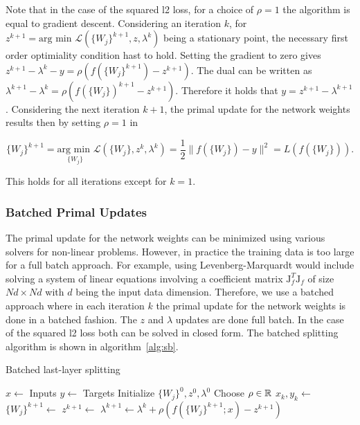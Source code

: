 \documentclass[english,11pt,a4paper]{article}
\begin{document}
Note that in the case of the squared l2 loss, for a choice of $\rho=1$ the algorithm is equal to gradient descent. Considering an iteration $k$, for $z^{k+1} = \text{arg min } \mathcal{L}(\{W_j\}^{k+1}, z, \lambda^k)$ being a stationary point, the necessary first order optimiality condition hast to hold. Setting the gradient to zero gives $z^{k+1} - \lambda^k - y = \rho(f(\{W_j\}^{k+1}) - z^{k+1})$. The dual can be written as $\lambda^{k+1} - \lambda^k = \rho(f(\{W_j\})^{k+1} - z^{k+1})$. Therefore it holds that $y = z^{k+1} - \lambda^{k+1}$. Considering the next iteration $k+1$, the primal update for the network weights results then by setting $\rho=1$ in 

\begin{equation}
	\{W_j\}^{k+1} = \underset{\{W_j\}}{\text{arg min }} \mathcal{L}(\{W_j\}, z^k, \lambda^k)
	= \frac{1}{2} \|f(\{W_j\}) - y\|^2 = L(f(\{W_j\})).
\end{equation}

This holds for all iterations except for $k=1$.

\subsubsection{Batched Primal Updates}

The primal update for the network weights can be minimized using various solvers for non-linear problems. However, in practice the training data is too large for a full batch approach. For example, using Levenberg-Marquardt would include solving a system of linear equations involving a coefficient matrix $\mathrm{J}_f^T \mathrm{J}_f$ of size $Nd \times Nd$ with $d$ being the input data dimension. Therefore, we use a batched approach where in each iteration $k$ the primal update for the network weights is done in a batched fashion. The $z$ and $\lambda$ updates are done full batch. In the case of the squared l2 loss both can be solved in closed form. The batched splitting algorithm is shown in algorithm~\ref{alg:sb}.

\begin{algorithm}
	\caption{Batched last-layer splitting}
	\label{alg:sb}
	\begin{algorithmic}[1]
		\State $x \gets$ Inputs
		\State $y \gets$ Targets
		\State Initialize $\{W_j\}^0, z^0, \lambda^0$
		\State Choose $\rho \in \mathbb{R}$
			\State $x_k, y_k \gets$ 
			\State $\{W_j\}^{k+1} \gets$ 
			\State $z^{k+1} \gets$ 
			\State $\lambda^{k+1} \gets \lambda^k + \rho (f(\{W_j\}^{k+1};x)-z^{k+1})$
		\EndFor
	\end{algorithmic}
\end{algorithm}
\end{document}
